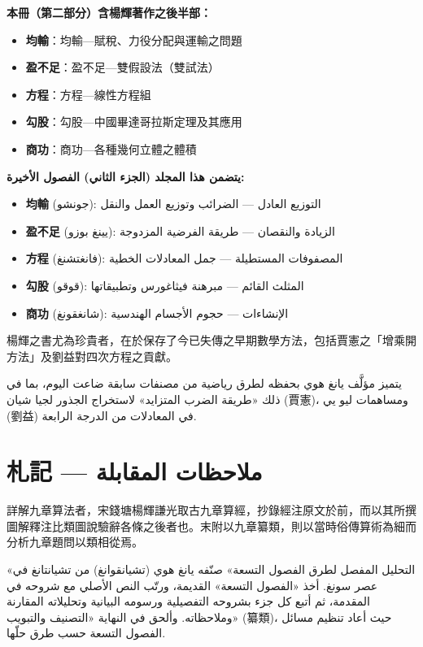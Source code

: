 \documentclass[11pt,a4paper]{article}
\newcommand{\ar}[1]{\arabicfont\beginR #1\endR}
\newcommand{\ChinCol}[1]{\begin{minipage}[t]{0.48\textwidth}#1\end{minipage}}
\newcommand{\ArabCol}[1]{\begin{minipage}[t]{0.48\textwidth}\arabicfont\beginR #1\endR\end{minipage}}
\newcommand{\parallelsection}[2]{%
  \noindent\ChinCol{#1}\hfill\ArabCol{#2}\par\vspace{0.5cm}%
}
\begin{document}
\parallelsection{%
\textbf{本冊（第二部分）含楊輝著作之後半部：}
\begin{itemize}[leftmargin=1em,topsep=0pt,itemsep=1pt]
  \item \textbf{均輸}：均輸---賦稅、力役分配與運輸之問題
  \item \textbf{盈不足}：盈不足---雙假設法（雙試法）
  \item \textbf{方程}：方程---線性方程組
  \item \textbf{勾股}：勾股---中國畢達哥拉斯定理及其應用
  \item \textbf{商功}：商功---各種幾何立體之體積
\end{itemize}%
}{%
\textbf{يتضمن هذا المجلد (الجزء الثاني) الفصول الأخيرة:}
\begin{itemize}[leftmargin=1em,topsep=0pt,itemsep=1pt]
  \item \textbf{均輸} (جونشو): التوزيع العادل --- الضرائب وتوزيع العمل والنقل
  \item \textbf{盈不足} (يينغ بوزو): الزيادة والنقصان --- طريقة الفرضية المزدوجة
  \item \textbf{方程} (فانغتشنغ): المصفوفات المستطيلة --- جمل المعادلات الخطية
  \item \textbf{勾股} (قوقو): المثلث القائم --- مبرهنة فيثاغورس وتطبيقاتها
  \item \textbf{商功} (شانغقونغ): الإنشاءات --- حجوم الأجسام الهندسية
\end{itemize}%
}

\parallelsection{%
楊輝之書尤為珍貴者，在於保存了今已失傳之早期數學方法，包括賈憲之「增乘開方法」及劉益對四次方程之貢獻。%
}{%
يتميز مؤلَّف يانغ هوي بحفظه لطرق رياضية من مصنفات سابقة ضاعت اليوم، بما في ذلك «طريقة الضرب المتزايد» لاستخراج الجذور لجيا شيان (賈憲)، ومساهمات ليو يي (劉益) في المعادلات من الدرجة الرابعة.%
}

\newpage

\section{札記 --- \ar{ملاحظات المقابلة}}
\label{sec:collation}

\parallelsection{%
詳解九章算法者，宋錢塘楊輝謙光取古九章算經，抄錄經注原文於前，而以其所撰圖解釋注比類圖說驗辭各條之後者也。末附以九章纂類，則以當時俗傳算術為細而分析九章題問以類相從焉。%
}{%
«التحليل المفصل لطرق الفصول التسعة» صنّفه يانغ هوي (تشيانقوانغ) من تشيانتانغ في عصر سونغ. أخذ «الفصول التسعة» القديمة، ورتّب النص الأصلي مع شروحه في المقدمة، ثم أتبع كل جزء بشروحه التفصيلية ورسومه البيانية وتحليلاته المقارنة وملاحظاته. وألحق في النهاية «التصنيف والتبويب» (纂類)، حيث أعاد تنظيم مسائل الفصول التسعة حسب طرق حلّها.%
}
\end{document}
